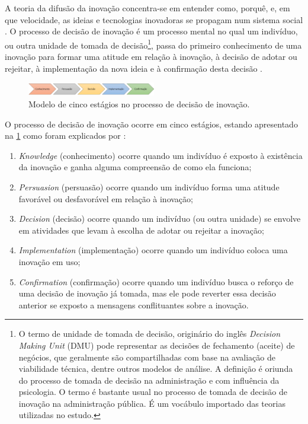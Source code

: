 \documentclass{textolivre-html}
\begin{document}
A teoria da difusão da inovação concentra-se em entender como, porquê, e, em que velocidade, as ideias e tecnologias inovadoras se propagam num sistema social \cite{rogers1983}. O processo de decisão de inovação é um processo mental no qual um indivíduo, ou outra unidade de tomada de decisão\footnote{O termo de unidade de tomada de decisão, originário do inglês \textit{Decision Making Unit} (DMU) pode representar as decisões de fechamento (aceite) de negócios, que geralmente são compartilhadas com base na avaliação de viabilidade técnica, dentre outros modelos de análise. A definição é oriunda do processo de tomada de decisão na administração e com influência da psicologia. O termo é bastante usual no processo de tomada de decisão de inovação na administração pública. É um vocábulo importado das teorias utilizadas no estudo.}, passa do primeiro conhecimento de uma inovação para formar uma atitude em relação à inovação, à decisão de adotar ou rejeitar, à implementação da nova ideia e à confirmação desta decisão \cite{davis1989,rogers1983}.

\begin{figure}[htbp]
 \centering
 \includegraphics[width=0.5\textwidth]{Fig01.png}
 \caption{Modelo de cinco estágios no processo de decisão de inovação.}
 \label{Fig01}
\end{figure}

O processo de decisão de inovação ocorre em cinco estágios, estando apresentado na \cref{Fig01} como foram explicados por \textcite[p. 36]{rogers1983}:

\begin{enumerate}
\item \textit{Knowledge} (conhecimento) ocorre quando um indivíduo é exposto à existência da inovação e ganha alguma compreensão de como ela funciona;
\item \textit{Persuasion} (persuasão) ocorre quando um indivíduo forma uma atitude favorável ou desfavorável em relação à inovação;
\item \textit{Decision} (decisão) ocorre quando um indivíduo (ou outra unidade) se envolve em atividades que levam à escolha de adotar ou rejeitar a inovação;
\item \textit{Implementation} (implementação) ocorre quando um indivíduo coloca uma inovação em uso;
\item \textit{Confirmation} (confirmação) ocorre quando um indivíduo busca o reforço de uma decisão de inovação já tomada, mas ele pode reverter essa decisão anterior se exposto a mensagens conflituantes sobre a inovação.
\end{enumerate}
\end{document}
